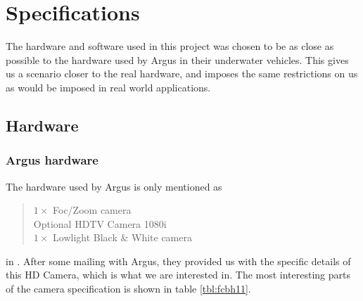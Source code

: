 
\chapter{Specifications}
The hardware and software used in this project was chosen to be as close as possible to the 
hardware used by Argus in their underwater vehicles. This gives us 
a scenario closer to the real hardware, and imposes the same 
restrictions on us as would be imposed in real world applications.

\section{Hardware}

\subsection{Argus hardware}
The hardware used by Argus is only mentioned as 
\begin{quote}
$1\times$ Foc/Zoom camera \\
Optional HDTV Camera 1080i \\
$1\times$ Lowlight Black \& White camera \\
\end{quote}
in \citet{argusROV}. After some mailing with Argus, they provided us 
with the specific details of this HD Camera, which is what we are interested in. 
The most interesting parts of the camera specification is shown in table \vref{tbl:fcbh11}.

